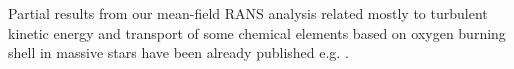 \documentclass[11pt,paper=a4]{article}
\newcommand{\eht}{\overline}
\newcommand{\fht}{\widetilde}
\begin{document}





  

Partial results from our mean-field RANS analysis related mostly to turbulent kinetic energy and transport of some chemical elements based on oxygen burning shell in massive stars have been already published e.g. \citet{MeakinArnett2007,ArnettMeakin2009,Meakin2010,VialletMeakin2013,Mocak2018}.
\end{document}

